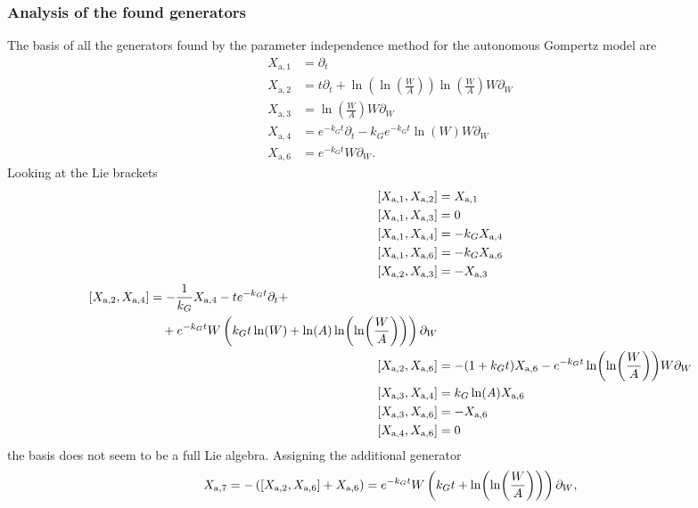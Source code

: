 \subsubsection{Analysis of the found generators}
The basis of all the generators found by the parameter independence method for the autonomous Gompertz model are
\begin{align}
  X_{\text{a},1} &= \partial_t \\
  X_{\text{a},2} &= t \partial_t + \ln(\ln(\frac{W}{A})) \ln(\frac{W}{A}) W \partial_W\\
  X_{\text{a},3} &= \ln(\frac{W}{A}) W \partial_W \\
  X_{\text{a},4} &= e^{-k_G t} \partial_t - k_G e^{-k_G t} \ln(W) W \partial_W\\
  X_{\text{a},6} &= e^{-k_G t} W \partial_W.
\end{align}
Looking at the Lie brackets
\begin{align}
  \comm{X_{\text{a},1}}{X_{\text{a},2}} &= X_{\text{a},1} \\
  \comm{X_{\text{a},1}}{X_{\text{a},3}} &= 0 \\
  \comm{X_{\text{a},1}}{X_{\text{a},4}} &= - k_G X_{\text{a},4} \\
  \comm{X_{\text{a},1}}{X_{\text{a},6}} &= - k_G X_{\text{a},6} \\
  \comm{X_{\text{a},2}}{X_{\text{a},3}} &= - X_{\text{a},3} \\
  \begin{split} \label{eq:gompertz-autonomous-new-generator-1}
    \comm{X_{\text{a},2}}{X_{\text{a},4}} &= -\frac{1}{k_G} X_{\text{a},4} - t e^{-k_G t} \partial_t + \\
    &\quad + e^{-k_G t} W \left(k_G t \ln(W) + \ln(A) \ln(\ln(\frac{W}{A}))\right) \partial_W
  \end{split}\\
  \comm{X_{\text{a},2}}{X_{\text{a},6}} &= -(1 + k_G t) X_{\text{a},6} - e^{-k_G t} \ln(\ln(\frac{W}{A})) W \partial_W \label{eq:gompertz-autonomous-new-generator-2} \\
  \comm{X_{\text{a},3}}{X_{\text{a},4}} &= k_G \ln(A) X_{\text{a},6} \\
  \comm{X_{\text{a},3}}{X_{\text{a},6}} &= - X_{\text{a},6}\\
  \comm{X_{\text{a},4}}{X_{\text{a},6}} &= 0
\end{align}
the basis does not seem to be a full Lie algebra.
Assigning the additional generator
\begin{equation}
  X_{\text{a},7} = - \left(\comm{X_{\text{a},2}}{X_{\text{a},6}} + X_{\text{a},6}\right) = e^{-k_G t} W \left(k_G t + \ln(\ln(\frac{W}{A}))\right) \partial_W,
\end{equation}
